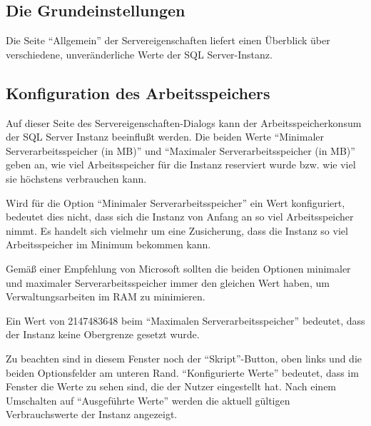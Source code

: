       \subsection{Die Grundeinstellungen}
        Die Seite \enquote{Allgemein} der Servereigenschaften liefert einen
        Überblick über verschiedene, unveränderliche Werte der SQL
        Server-Instanz.
      \subsection{Konfiguration des Arbeitsspeichers}
        Auf dieser Seite des Servereigenschaften-Dialogs kann der
        Arbeitsspeicherkonsum der SQL Server Instanz beeinflußt werden. Die
        beiden Werte \enquote{Minimaler Serverarbeitsspeicher (in MB)} und
        \enquote{Maximaler Serverarbeitsspeicher (in MB)} geben an, wie viel
        Arbeitsspeicher für die Instanz reserviert wurde bzw. wie viel sie
        höchstens verbrauchen kann.
        \begin{merke}
          Wird für die Option \enquote{Minimaler Serverarbeitsspeicher} ein
          Wert konfiguriert, bedeutet dies nicht, dass sich die Instanz von
          Anfang an so viel Arbeitsspeicher nimmt. Es handelt sich vielmehr um
          eine Zusicherung, dass die Instanz so viel Arbeitsspeicher
          im Minimum bekommen kann.
        \end{merke}
        Gemäß einer Empfehlung von Microsoft sollten die beiden Optionen
        minimaler und maximaler Serverarbeitsspeicher immer den gleichen Wert
        haben, um Verwaltungsarbeiten im RAM zu minimieren.
        \begin{merke}
          Ein Wert von 2147483648 beim \enquote{Maximalen
          Serverarbeitsspeicher} bedeutet, dass der Instanz keine Obergrenze
          gesetzt wurde.
        \end{merke} 
        Zu beachten sind in diesem Fenster noch der \enquote{Skript}-Button,
        oben links und die beiden Optionsfelder am unteren Rand.
        \enquote{Konfigurierte Werte} bedeutet, dass im Fenster die Werte zu
        sehen sind, die der Nutzer eingestellt hat. Nach einem Umschalten auf
        \enquote{Ausgeführte Werte} werden die aktuell gültigen Verbrauchswerte
        der Instanz angezeigt.
        
